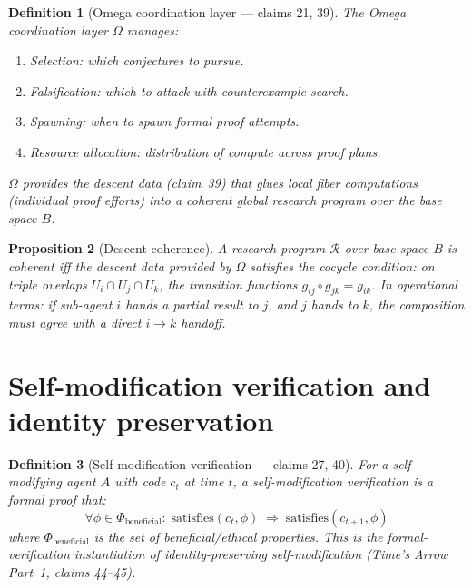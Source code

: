\documentclass[11pt,a4paper]{article}
\newtheorem{definition}{Definition}[section]
\newtheorem{proposition}[definition]{Proposition}
\begin{document}
\begin{definition}[Omega coordination layer --- claims 21, 39]
\label{def:omega}
The \emph{Omega coordination layer} $\Omega$ manages:
\begin{enumerate}
\item Selection: which conjectures to pursue.
\item Falsification: which to attack with counterexample search.
\item Spawning: when to spawn formal proof attempts.
\item Resource allocation: distribution of compute across proof plans.
\end{enumerate}
$\Omega$ provides the \emph{descent data} (claim~39) that glues local
fiber computations (individual proof efforts) into a coherent global
research program over the base space $B$.
\end{definition}

\begin{proposition}[Descent coherence]
\label{prop:descent}
A research program $\mathcal{R}$ over base space $B$ is coherent iff
the descent data provided by $\Omega$ satisfies the cocycle condition:
on triple overlaps $U_i \cap U_j \cap U_k$, the transition functions
$g_{ij} \circ g_{jk} = g_{ik}$. In operational terms: if sub-agent $i$
hands a partial result to $j$, and $j$ hands to $k$, the composition
must agree with a direct $i \to k$ handoff.
\end{proposition}

\section{Self-modification verification and identity preservation}
\label{sec:self-mod}

\begin{definition}[Self-modification verification --- claims 27, 40]
\label{def:self-mod}
For a self-modifying agent $A$ with code $c_t$ at time $t$, a
\emph{self-modification verification} is a formal proof that:
\[
  \forall \phi \in \Phi_{\text{beneficial}}: \;
  \text{satisfies}(c_t, \phi) \;\Longrightarrow\;
  \text{satisfies}(c_{t+1}, \phi)
\]
where $\Phi_{\text{beneficial}}$ is the set of beneficial/ethical
properties. This is the formal-verification instantiation of
identity-preserving self-modification (Time's Arrow Part~1, claims 44--45).
\end{definition}
\end{document}
